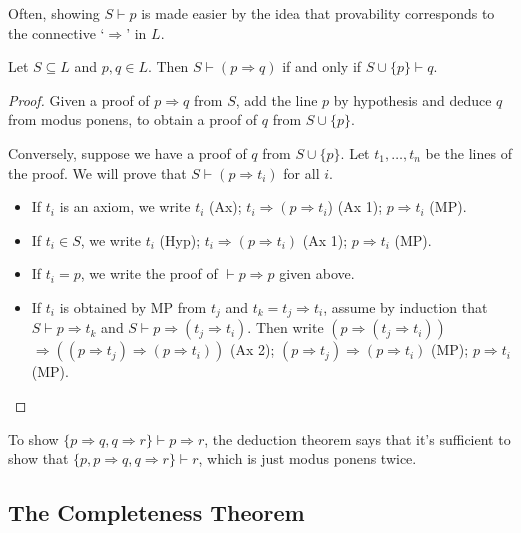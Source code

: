 \documentclass[a4paper, 10pt, twocolumn]{amsart}
\begin{document}
Often, showing $S \vdash p$ is made easier by the idea that provability corresponds to the connective `$\Rightarrow$' in $L$. 

\begin{theorem}
  Let $S \subseteq L$ and $p, q \in L$. Then $S \vdash (p \Rightarrow q)$ if and only if $S \cup \{p\} \vdash q$. 
\end{theorem}
\begin{proof}
Given a proof of $p \Rightarrow q$ from $S$, add the line $p$ by hypothesis and deduce $q$ from modus ponens, to obtain a proof of $q$ from $S \cup\{p\}$.

Conversely, suppose we have a proof of $q$ from $S \cup\{p\}$. Let $t_1, \ldots, t_n$ be the lines of the proof. We will prove that $S \vdash\left(p \Rightarrow t_i\right)$ for all $i$.
\begin{itemize}
  \item If $t_i$ is an axiom, we write $t_i$ (Ax); $t_i \Rightarrow\left(p \Rightarrow t_i\right.$) (Ax 1); $p \Rightarrow t_i$ (MP).
  \item If $t_i \in S$, we write $t_i$ (Hyp); $t_i \Rightarrow\left(p \Rightarrow t_i\right)$ (Ax 1); $p \Rightarrow t_i$ (MP).
  \item If $t_i=p$, we write the proof of $\vdash p \Rightarrow p$ given above.
  \item If $t_i$ is obtained by MP from $t_j$ and $t_k = t_j \Rightarrow t_i$, 
  assume by induction that $S \vdash p \Rightarrow t_k$ and $S \vdash p \Rightarrow\left(t_j \Rightarrow t_i\right)$. Then write $\left(p \Rightarrow\left(t_j \Rightarrow t_i\right)\right) $ $\Rightarrow\left(\left(p \Rightarrow t_j\right) \Rightarrow\left(p \Rightarrow t_i\right)\right)$ (Ax 2); $\left(p \Rightarrow t_j\right) \Rightarrow\left(p \Rightarrow t_i\right)$ (MP); $p \Rightarrow t_i$ (MP).
\end{itemize}\vspace{-1pc}
\end{proof}

\begin{example}
  To show $\{p \Rightarrow q, q \Rightarrow r\} \vdash p \Rightarrow r$, the deduction theorem says that it's sufficient to show that $\{p, p\Rightarrow q, q \Rightarrow r\} \vdash r$, which is just modus ponens twice.
\end{example}

\subsection{The Completeness Theorem}
\end{document}
